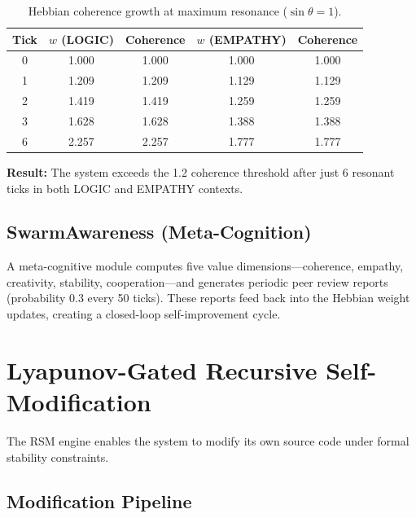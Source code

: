 \documentclass[11pt,a4paper]{article}
\begin{document}
\begin{table}[h]
\centering
\caption{Hebbian coherence growth at maximum resonance ($\sin\theta = 1$).}
\label{tab:coherence}
\begin{tabular}{ccccc}
\toprule
\textbf{Tick} & \textbf{$w$ (LOGIC)} & \textbf{Coherence} & \textbf{$w$ (EMPATHY)} & \textbf{Coherence} \\
\midrule
0 & 1.000 & 1.000 & 1.000 & 1.000 \\
1 & 1.209 & 1.209 & 1.129 & 1.129 \\
2 & 1.419 & 1.419 & 1.259 & 1.259 \\
3 & 1.628 & 1.628 & 1.388 & 1.388 \\
6 & 2.257 & 2.257 & 1.777 & 1.777 \\
\bottomrule
\end{tabular}
\end{table}

\textbf{Result:} The system exceeds the 1.2 coherence threshold after just 6 resonant ticks in both LOGIC and EMPATHY contexts.

\subsection{SwarmAwareness (Meta-Cognition)}

A meta-cognitive module computes five value dimensions---coherence, empathy, creativity, stability, cooperation---and generates periodic peer review reports (probability 0.3 every 50 ticks). These reports feed back into the Hebbian weight updates, creating a closed-loop self-improvement cycle.

\section{Lyapunov-Gated Recursive Self-Modification}
\label{sec:rsm}

The RSM engine enables the system to modify its own source code under formal stability constraints.

\subsection{Modification Pipeline}
\end{document}
